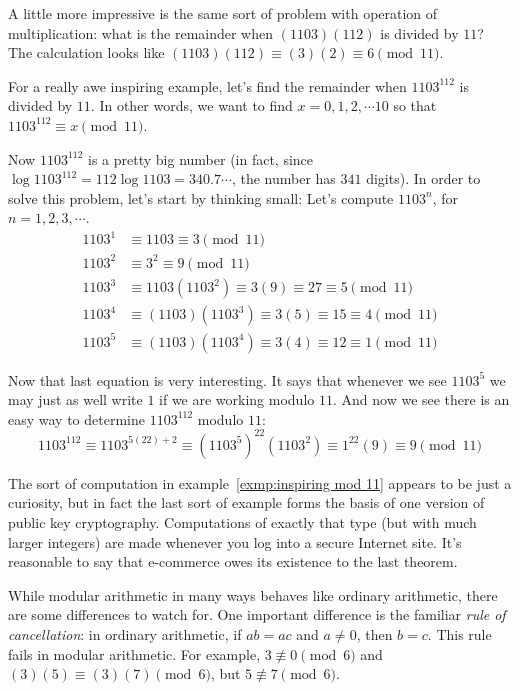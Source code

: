 \begin{exmp}
 A little more impressive is the same sort of problem with operation of multiplication:
 what is the remainder when $(1103)(112)$ is divided by $11$?
 The calculation looks like $(1103)(112) \equiv (3)(2)\equiv 6 \pmod{11}$.
\end{exmp}

\begin{exmp}\label{exmp:inspiring mod 11}
 For a really  awe inspiring example, let's find the remainder when $1103^{112}$ is 
 divided by $11$. In other words, we want to find $x=0,1,2,\cdots 10$ 
 so that $1103^{112}\equiv x\pmod{11}$.
 
 Now $1103^{112}$ is a pretty big number (in fact, since $\log 1103^{112} 
 =112\log 1103 = 340.7\cdots$, the number has $341$ digits). 
 In order to solve this problem, let's start by thinking small: Let's compute
 $1103^n$, for $n=1,2,3,\cdots$.
 \begin{align*}
  1103^1 & \equiv 1103 \equiv 3 \pmod{11} \\
  1103^2 & \equiv 3^2 \equiv 9 \pmod{11} \\
  1103^3 & \equiv 1103(1103^2)\equiv 3(9) \equiv 27 \equiv 5 \pmod{11} \\
  1103^4 & \equiv (1103)(1103^3) \equiv 3(5) \equiv 15\equiv 4 \pmod{11} \\
  1103^5 & \equiv (1103)(1103^4) \equiv 3(4) \equiv 12 \equiv 1 \pmod{11}
  \end{align*}
 
 Now that last equation is very interesting. It says that whenever we
 see $1103^5$ we may just as well write $1$ if we are working modulo $11$.
 And now we see there is an easy way to determine
 $1103^{112}$ modulo $11$:
 \[
 1103^{112} \equiv 1103^{5(22) + 2}\equiv (1103^{5})^{22}(1103^2)
 \equiv 1^{22}(9) \equiv 9 \pmod {11}
 \]
\end{exmp}

\clearpage
The sort of computation in example~\ref{exmp:inspiring mod 11} appears 
to be just a curiosity, but in fact the last sort of 
example forms the basis of one version of public key cryptography.  Computations of
exactly that type (but with much larger integers) are made whenever you log into
a secure Internet site. It's reasonable to say that e-commerce owes its existence
to the last theorem.  


While modular arithmetic in many ways behaves like ordinary arithmetic, there are some 
differences to watch for. One important difference is the familiar \textit{rule of 
cancellation}:\marginnote{\dbend} in ordinary arithmetic, if $ab=ac$ and $a\not=0$, then $b=c$.
This rule fails in modular arithmetic. For example, 
$3\not\equiv0\pmod 6$ 
and  $(3)(5)\equiv (3)(7)\pmod 6$, but $5\not\equiv 7\pmod{6}$.


